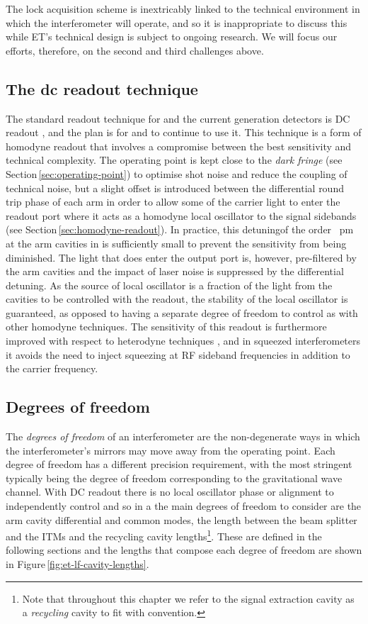 The lock acquisition scheme is inextricably linked to the technical environment in which the interferometer will operate, and so it is inappropriate to discuss this while \gls{ET}'s technical design is subject to ongoing research. We will focus our efforts, therefore, on the second and third challenges above.

\subsection{The dc readout technique}
The standard readout technique for \GEO{} and the current generation detectors is \gls{DC} readout \cite{Hild2007, Ward2008, Fricke2012}, and the plan is for \ETLF{} and \ETHF{} to continue to use it. This technique is a form of homodyne readout that involves a compromise between the best sensitivity and technical complexity. The operating point is kept close to the \emph{dark fringe} (see Section\,\ref{sec:operating-point}) to optimise shot noise and reduce the coupling of technical noise, but a slight offset is introduced between the differential round trip phase of each arm in order to allow some of the carrier light to enter the readout port where it acts as a homodyne local oscillator to the signal sidebands (see Section\,\ref{sec:homodyne-readout}). In practice, this detuning\textemdash of the order \SI{}{\pico\meter} at the arm cavities in \ALIGO{}\textemdash is sufficiently small to prevent the sensitivity from being diminished. The light that does enter the output port is, however, pre-filtered by the arm cavities and the impact of laser noise is suppressed by the differential detuning. As the source of local oscillator is a fraction of the light from the cavities to be controlled with the readout, the stability of the local oscillator is guaranteed, as opposed to having a separate degree of freedom to control as with other homodyne techniques. The sensitivity of this readout is furthermore improved with respect to heterodyne techniques \cite{Fricke2012}, and in squeezed interferometers it avoids the need to inject squeezing at \gls{RF} sideband frequencies in addition to the carrier frequency.

\subsection{\label{sec:dofs-of-drfpmi}Degrees of freedom}
The \emph{degrees of freedom} of an interferometer are the non-degenerate ways in which the interferometer's mirrors may move away from the operating point. Each degree of freedom has a different precision requirement, with the most stringent typically being the degree of freedom corresponding to the gravitational wave channel. With \gls{DC} readout there is no local oscillator phase or alignment to independently control and so in a \DRFPMI{} the main degrees of freedom to consider are the arm cavity differential and common modes, the length between the beam splitter and the \glspl{ITM} and the recycling cavity lengths\footnote{Note that throughout this chapter we refer to the signal extraction cavity as a \emph{recycling} cavity to fit with convention.}. These are defined in the following sections and the lengths that compose each degree of freedom are shown in Figure\,\ref{fig:et-lf-cavity-lengths}.

